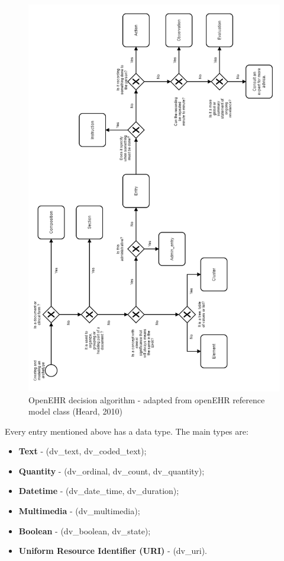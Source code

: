 \documentclass[mim_thesis.tex]{subfiles}
\begin{document}
\begin{figure}[H]
	\centering
    \includegraphics[width=1.05\textwidth]{img/decision_alg_arch.PNG}
	\caption{OpenEHR decision algorithm - adapted from openEHR reference model class (Heard, 2010) }
	\label{fig:decision_alg_arch}
\end{figure}

Every entry mentioned above has a data type. The main types are:
\begin{itemize}[noitemsep]
\item \textbf{Text} - (dv\_text, dv\_coded\_text);
\item \textbf{Quantity} - (dv\_ordinal, dv\_count, dv\_quantity); 
\item \textbf{Date\/time} - (dv\_date\_time, dv\_duration); 
\item \textbf{Multimedia} - (dv\_multimedia); 
\item \textbf{Boolean} - (dv\_boolean, dv\_state); 
\item \textbf{Uniform Resource Identifier (URI)} - (dv\_uri).
\end{itemize}
\end{document}
